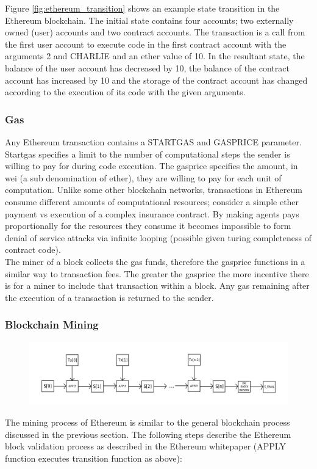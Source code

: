 Figure \ref{fig:ethereum_transition} shows an example state transition in the Ethereum blockchain. The initial state contains four accounts; two externally owned (user) accounts and two contract accounts. The transaction is a call from the first user account to execute code in the first contract account with the arguments 2 and CHARLIE and an ether value of 10. In the resultant state, the balance of the user account has decreased by 10, the balance of the contract account has increased by 10 and the storage of the contract account has changed according to the execution of its code with the given arguments.\\

\subsubsection{Gas}
Any Ethereum transaction contains a STARTGAS and GASPRICE parameter. Startgas specifies a limit to the number of computational steps the sender is willing to pay for during code execution. The gasprice specifies the amount, in wei (a sub denomination of ether), they are willing to pay for each unit of computation. Unlike some other blockchain networks, transactions in Ethereum consume different amounts of computational resources; consider a simple ether payment vs execution of a complex insurance contract. By making agents pays proportionally for the resources they consume it becomes impossible to form denial of service attacks via infinite looping (possible given turing completeness of contract code). \\

The miner of a block collects the gas funds, therefore the gasprice functions in a similar way to transaction fees. The greater the gasprice the more incentive there is for a miner to include that transaction within a block. Any gas remaining after the execution of a transaction is returned to the sender.\\ 

\subsubsection{Blockchain Mining}
\begin{figure}
\centering
\includegraphics[width=\textwidth]{Figures/ethereum_state_transition}
\decoRule
\caption[]{}
\label{fig:ethereum_state_transition}
\end{figure}
The mining process of Ethereum is similar to the general blockchain process discussed in the previous section. The following steps describe the Ethereum block validation process as described in the Ethereum whitepaper (APPLY function executes transition function as above):

